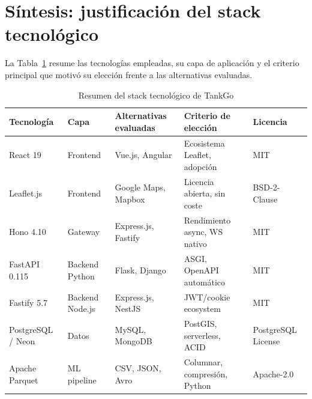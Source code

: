 \section{Síntesis: justificación del stack tecnológico}

La Tabla~\ref{tab:stack_tecnologico} resume las tecnologías empleadas, su capa de
aplicación y el criterio principal que motivó su elección frente a las alternativas
evaluadas.

\begin{table}[H]
    \centering
    \caption{Resumen del stack tecnológico de TankGo}
    \label{tab:stack_tecnologico}
    \small
    \begin{tabularx}{\textwidth}{llXXX}
        \toprule
        \textbf{Tecnología}    & \textbf{Capa}   & \textbf{Alternativas evaluadas} & \textbf{Criterio de elección}  & \textbf{Licencia}                              \\
        \midrule
        React 19               & Frontend        & Vue.js, Angular                 & Ecosistema Leaflet, adopción   & MIT                                            \\
        Leaflet.js             & Frontend        & Google Maps, Mapbox             & Licencia abierta, sin coste    & BSD-2-Clause                                   \\
        Hono 4.10              & Gateway         & Express.js, Fastify             & Rendimiento async, WS nativo   & MIT                                            \\
        FastAPI 0.115          & Backend Python  & Flask, Django                   & ASGI, OpenAPI automático       & MIT                                            \\
        Fastify 5.7            & Backend Node.js & Express.js, NestJS              & JWT/cookie ecosystem           & MIT                                            \\
        PostgreSQL / Neon      & Datos           & MySQL, MongoDB                  & PostGIS, serverless, ACID      & PostgreSQL License                             \\
        Apache Parquet         & ML pipeline     & CSV, JSON, Avro                 & Columnar, compresión, Python   & Apache-2.0                                     \\

\end{tabularx}
\end{table}
